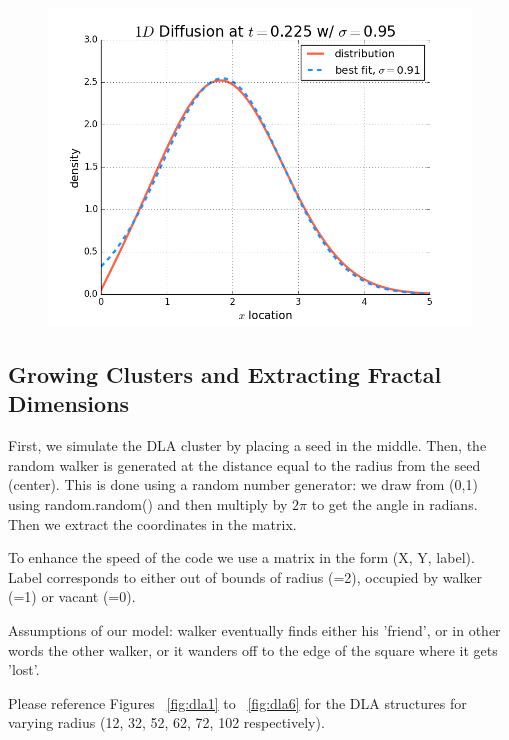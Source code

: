 \documentclass[12pt]{article}
\begin{document}
\begin{figure}[!htb]
  \caption{}\label{fig:probdensity5}
\endminipage\hfill
{}
  \includegraphics[width=\linewidth]{probdensityt2000.png}
  \caption{}\label{fig:probdensity6}
\endminipage\hfill
\end{figure}

\subsection{Growing Clusters and Extracting Fractal Dimensions}
\label{sec:clustersandfractals}

First, we simulate the DLA cluster by placing a seed in the middle. Then, the random walker is generated at the distance equal to the radius from the seed (center). This is done using a random number generator: we draw from (0,1) using random.random() and then multiply by $2\pi$ to get the angle in radians. Then we extract the coordinates in the matrix.

To enhance the speed of the code we use a matrix in the form (X, Y, label). Label corresponds to either out of bounds of radius (=2), occupied by walker (=1) or vacant (=0). 

Assumptions of our model: walker eventually finds either his 'friend', or in other words the other walker, or it wanders off to the edge of the square where it gets 'lost'. 

Please reference Figures ~\ref{fig:dla1} to ~\ref{fig:dla6} for the DLA structures for varying radius (12, 32, 52, 62, 72, 102 respectively).
\end{document}

